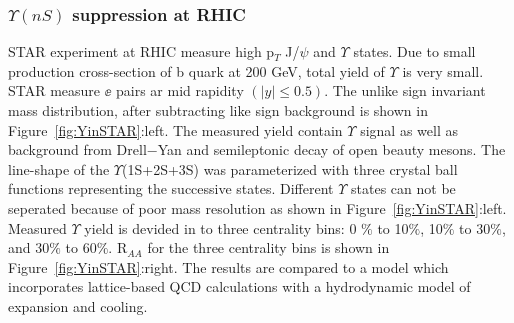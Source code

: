 
\subsubsection{$\Upsilon(nS)$ suppression at RHIC}
STAR experiment at RHIC measure high p$_T$ J/$\psi$ and $\Upsilon$ states. 
Due to small production cross-section of b quark at 200 GeV, total yield 
of $\Upsilon$ is very small. STAR measure $\ee$ pairs ar mid rapidity $(|y| \leq 0.5)$. The unlike sign invariant
mass distribution, after subtracting like sign background is shown in Figure~\ref{fig:YinSTAR}:left. The measured yield
contain $\Upsilon$ signal as well as background from Drell$-$Yan and semileptonic decay of open beauty mesons.
The line-shape of the $\Upsilon$(1S+2S+3S) was parameterized with three crystal ball functions representing the successive states.
Different $\Upsilon$ states can not be seperated because of poor mass resolution as shown in Figure~\ref{fig:YinSTAR}:left.  
Measured $\Upsilon$ yield is devided in to three centrality bins: 0 $\%$ to 10$\%$, 10$\%$ to 30$\%$, and 30$\%$ to 60$\%$. 
R$_{AA}$ for the three centrality bins is shown in Figure~\ref{fig:YinSTAR}:right.
The results are compared to a model \cite{StrickLand} which incorporates lattice-based QCD calculations with a hydrodynamic
model of expansion and cooling. 

